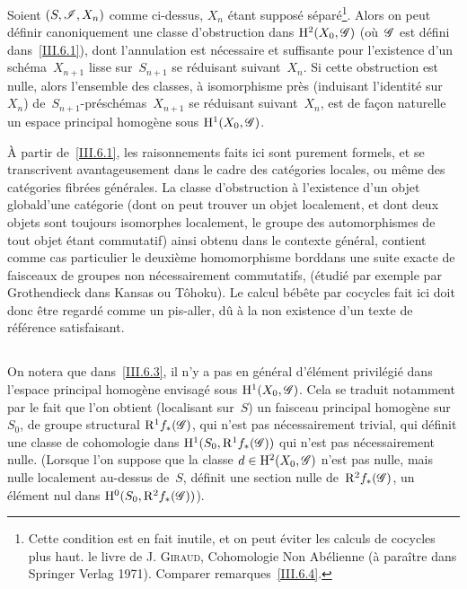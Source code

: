 \begin{theoreme}
\label{III.6.3}
Soient $(S,\cal{I},X_n)$ comme ci-dessus, $X_n$ \'etant suppos\'e
s\'epar\'e\footnote{Cette condition est en fait inutile, et on
peut \'eviter les calculs de cocycles plus haut. \Cf le livre de J.
\textsc{Giraud}, Cohomologie Non Ab\'elienne (\`a para\^itre dans
Springer Verlag 1971). Comparer remarques~\ref{III.6.4}.}. Alors on
peut d\'efinir canoniquement une classe d'obstruction dans
$\H^2(X_0,\cal{G})$ (o\`u~$\cal{G}$ est d\'efini
dans~\ref{III.6.1}), dont l'annulation est n\'ecessaire et
suffisante pour l'existence d'un sch\'ema~$X_{n+1}$ lisse
sur~$S_{n+1}$ se r\'eduisant suivant~$X_n$. Si cette obstruction
est nulle, alors l'ensemble des classes, \`a isomorphisme pr\`es
(induisant l'identit\'e sur~$X_n$)
de~$S_{n+1}$-pr\'esch\'emas~$X_{n+1}$ se r\'eduisant
suivant~$X_n$, est de fa\c con naturelle un espace principal
homog\`ene sous $\H^1(X_0,\cal{G})$.
\end{theoreme}

\begin{remarques}
\label{III.6.4}
\`A partir de~\ref{III.6.1}, les raisonnements faits ici sont purement
formels, et se transcrivent avantageusement dans le cadre des
cat\'egories locales,
ou m\^eme des cat\'egories fibr\'ees g\'en\'erales. La
classe d'obstruction \`a l'existence d'un objet \og global\fg d'une
cat\'egorie (dont on peut trouver un objet \og localement\fg, et dont
deux objets sont toujours \og isomorphes localement\fg, le groupe des
automorphismes de tout objet \'etant commutatif) ainsi obtenu dans
le contexte g\'en\'eral, contient comme cas particulier le
\og deuxi\`eme homomorphisme bord\fg dans une suite exacte de faisceaux
de groupes non n\'ecessairement commutatifs, (\'etudi\'e par
exemple par Grothendieck dans Kansas ou
T\^ohoku).
Le calcul b\'eb\^ete par cocycles fait ici doit donc \^etre regard\'e
comme un pis-aller, d\^u \`a la non existence d'un texte de
r\'ef\'erence satisfaisant.
\end{remarques}

\subsection{}
\label{III.6.5}
On notera que dans~\ref{III.6.3}, il n'y a pas en g\'en\'eral
d'\'el\'ement privil\'egi\'e dans l'espace principal
homog\`ene envisag\'e sous $\H^1(X_0,\cal{G})$. Cela se traduit
notamment par le fait que l'on obtient (localisant sur~$S$) un
faisceau principal homog\`ene sur~$S_0$, de groupe structural
$\R^1f_*(\cal{G})$, qui n'est pas n\'ecessairement trivial, \ie qui
d\'efinit une classe de cohomologie dans
$\H^1(S_0,\R^1f_*(\cal{G}))$ qui n'est pas n\'ecessairement nulle.
(Lorsque l'on suppose que la classe $d\in\H^2(X_0,\cal{G})$ n'est pas
nulle, mais nulle \og localement au-dessus de~$S$\fg, \ie d\'efinit
une section nulle de~$\R^2f_*(\cal{G})$, \ie un \'el\'ement nul
dans $\H^0(S_0,\R^2f_*(\cal{G}))$).

